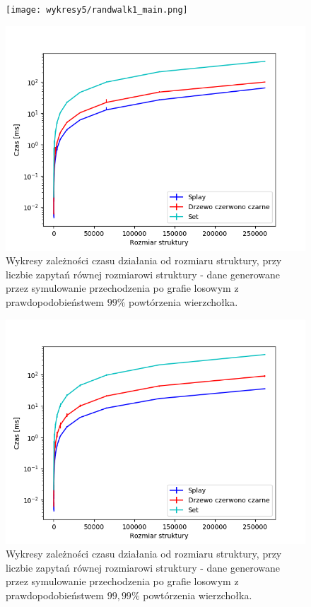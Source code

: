 \documentclass[declaration,shortabstract]{iithesis}
\theoremstyle{thm}
\theoremstyle{remark}
\theoremstyle{plain}
\theoremstyle{plain}
\theoremstyle{plain}
\begin{document}
\begin{figure}[H]
\begin{minipage}[b]{.45\textwidth}
\centering
\texttt{[image: wykresy5/randwalk1\_main.png]}
\end{minipage}
\hfill
\begin{minipage}[b]{.45\textwidth}
\centering
\includegraphics[width=1\textwidth]{wykresy3/randwalk1_main.png}
\end{minipage}
\caption{Wykresy zależności czasu działania od rozmiaru struktury, przy liczbie zapytań równej rozmiarowi struktury - dane generowane przez symulowanie przechodzenia po grafie losowym z prawdopodobieństwem  \(99\%\) powtórzenia wierzchołka.}
\end{figure}

\begin{figure}[H]  

\centering
    \includegraphics[scale=0.45]{wykresy3/randwalk001_main.png}
      \caption{Wykresy zależności czasu działania od rozmiaru struktury, przy liczbie zapytań równej rozmiarowi struktury - dane generowane przez symulowanie przechodzenia po grafie losowym z prawdopodobieństwem  \(99,99\%\) powtórzenia wierzchołka.}  
\end{figure}
\end{document}
